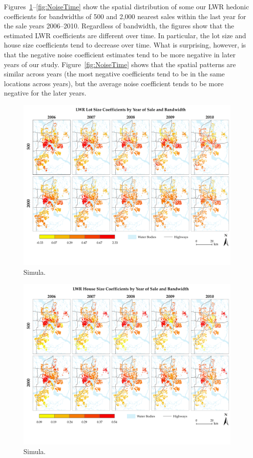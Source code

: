 \documentclass{article}\usepackage{graphicx, color}
\begin{document}
Figures~\ref{fig:AcreTime}--\ref{fig:NoiseTime} show the spatial distribution of some our LWR hedonic coefficients for bandwidths of 500 and 2,000 nearest sales within the last year for the sale years 2006--2010. Regardless of bandwidth, the figures show that the estimated LWR coefficients are different over time. In particular, the lot size and house size coefficients tend to decrease over time. What is surprising, however, is that the negative noise coefficient estimates tend to be more negative in later years of our study. Figure~\ref{fig:NoiseTime} shows that the spatial patterns are similar across years (the most negative coefficients tend to be in the same locations across years), but the average noise coefficient tends to be more negative for the later years.

\begin{figure}
 \includegraphics[trim = 0cm 2cm 0cm 0cm, clip = true, width = \textwidth]{../graphs/Acre_50_200_ByYear}
 \caption{Simula.}
 \label{fig:AcreTime}
\end{figure}

\begin{figure}
 \includegraphics[trim = 0cm 2cm 0cm 0cm, clip = true, width = \textwidth]{../graphs/FinFt_50_200_ByYear}
 \caption{Simula.}
 \label{fig:HouseTime}
\end{figure}
\end{document}
